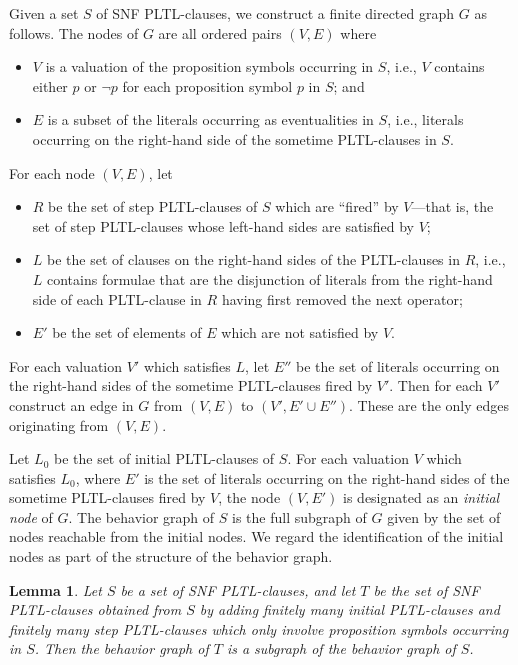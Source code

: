 \documentclass[nohyperref]{acmtrans2f}
\newtheorem{sublemma}{Lemma}[subsection]
\begin{document}
\begin{subdefn}
%
Given a set $S$ of SNF PLTL-clauses, we construct a finite directed graph $G$
as follows. The nodes of $G$ are all ordered pairs $(V,E)$ where
\begin{itemize}
\item $V$ is a valuation of the proposition symbols occurring in $S$, i.e.,
$V$ contains either $p$ or $\neg p$ for each proposition symbol $p$ in
$S$; and 
\item $E$ is a subset of the literals occurring as eventualities in $S$, i.e., literals
occurring on the right-hand side of the sometime PLTL-clauses in $S$. 
\end{itemize}
For each
node $(V,E)$, let
\begin{itemize}
\item $R$ be the set of step PLTL-clauses of $S$ which are
``fired'' by $V$---that is, the set of step PLTL-clauses whose left-hand
sides are satisfied by $V$;
\item $L$ be the set of clauses on the
right-hand sides of the PLTL-clauses in $R$, i.e., $L$ contains
formulae that are the disjunction of literals from the  right-hand side of
each PLTL-clause in $R$ having first removed the next operator;
\item $E'$ be the set of elements of
$E$ which are not satisfied by $V$.  
\end{itemize}
For each valuation $V'$ which
satisfies $L$, let $E''$ be the set of literals occurring on the
right-hand sides of the sometime PLTL-clauses fired by $V'$.  Then for
each $V'$ construct an edge in $G$ from $(V,E)$ to $(V',E' \cup E'')$.
These are the only edges originating from $(V,E)$. 

Let $L_0$ be
the set of initial PLTL-clauses of $S$. For each valuation $V$ which
satisfies $L_0$, where $E'$ is the set of literals occurring on the
right-hand sides of the sometime PLTL-clauses fired by $V$, the node
$(V,E')$ is designated as an {\em initial node} of $G$. The behavior
graph of $S$ is the full subgraph of $G$ given by the set of nodes
reachable from the initial nodes. We regard the identification of the
initial nodes as part of the structure of the behavior graph.
\end{subdefn}

\begin{sublemma}
\label{add.rules}
Let $S$ be a set of SNF PLTL-clauses, and let $T$ be the set of SNF PLTL-clauses
obtained from $S$ by adding finitely many initial PLTL-clauses and finitely
many step PLTL-clauses which only involve proposition symbols occurring in $S$. Then
the behavior graph of $T$ is a subgraph of the behavior graph of
$S$.
\end{sublemma}
\end{document}

